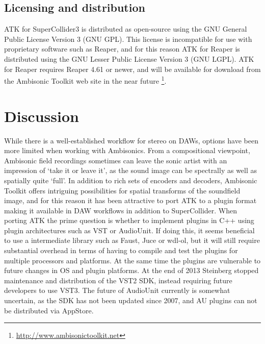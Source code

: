 \documentclass{article}
\begin{document}
\subsection{Licensing and distribution}\label{sec:license}

ATK for SuperCollider3 is distributed as open-source using the GNU General Public License Version 3 (GNU GPL).
This license is incompatible for use with proprietary software such as Reaper, and for this reason ATK for Reaper is distributed using the GNU Lesser Public License Version 3 (GNU LGPL).
ATK for Reaper requires Reaper 4.61 or newer, and will be available for download from the Ambisonic Toolkit web site in the near future \footnote{\href{http://www.ambisonictoolkit.net}{http://www.ambisonictoolkit.net}}.



\section{Discussion}\label{sec:discussion}

While there is a well-established workflow for stereo on DAWs, options have been more limited when working with Ambisonics.
From a compositional viewpoint, Ambisonic field recordings sometimes can leave the sonic artist with an impression of `take it or leave it', as the sound image can be spectrally as well as spatially quite `full'.
In addition to rich sets of encoders and decoders, Ambisonic Toolkit offers intriguing possibilities for spatial transforms of the soundfield image, and for this reason it has been attractive to port ATK to a plugin format making it available in DAW workflows in addition to SuperCollider.
When porting ATK the prime question is whether to implement plugins in C++ using plugin architectures such as VST or AudioUnit.
If doing this, it seems beneficial to use a intermediate library such as Faust, Juce or wdl-ol, but it will still require substantial overhead in terms of having to compile and test the plugins for multiple processors and platforms.
At the same time the plugins are vulnerable to future changes in OS and plugin platforms.
At the end of 2013 Steinberg stopped maintenance and distribution of the VST2 SDK, instead requiring future developers to use VST3. The future of AudioUnit currently is somewhat uncertain, as the SDK has not been updated since 2007, and AU plugins can not be distributed via AppStore.
\end{document}
